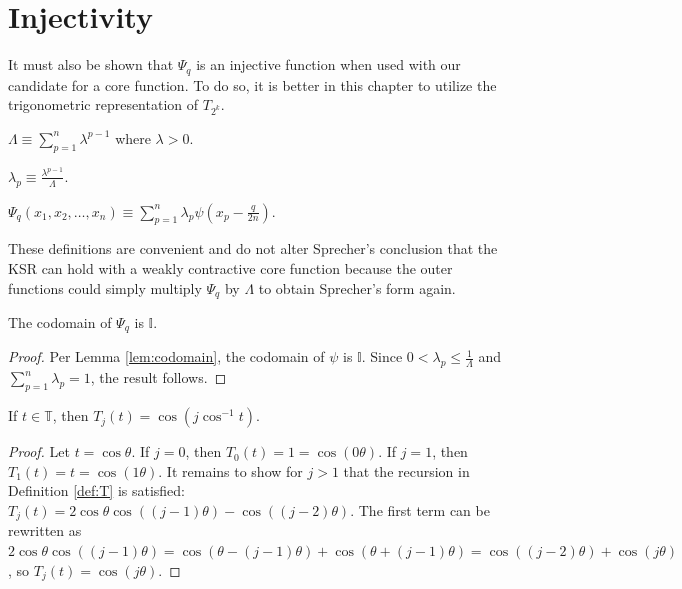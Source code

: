 \chapter{Injectivity}\label{ch:Injectivity}
It must also be shown that $\Psi_q$ is an injective function when used with our candidate for a core function. To do so, it is better in this chapter to utilize the trigonometric representation of $T_{2^k}$.
\begin{definition}[Normalizer]
  \label{def:Lambda}
  $\Lambda \equiv \sum\limits_{p = 1}^n \lambda^{p - 1}$ where $\lambda > 0$.
\end{definition}
\begin{definition}
  \label{def:lambda_p}
  $\lambda_p \equiv \frac{\lambda^{p - 1}}{\Lambda}$.
\end{definition}
\begin{definition}
  \label{def:Psi}
  $\Psi_q\left(x_1, x_2, \dots, x_n\right) \equiv \sum\limits_{p = 1}^n \lambda_p \psi\left(x_p - \frac{q}{2n}\right)$.
\end{definition}
\noindent These definitions are convenient and do not alter Sprecher's conclusion that the KSR can hold with a weakly contractive core function because the outer functions could simply multiply $\Psi_q$ by $\Lambda$ to obtain Sprecher's form again.
\begin{lemma}
  \label{lem:Psi_q_codomain}
  The codomain of $\Psi_q$ is $\mathbb{I}$.
\end{lemma}
\begin{proof}
  Per Lemma \ref{lem:codomain}, the codomain of $\psi$ is $\mathbb{I}$. Since $0 < \lambda_p \leq \frac{1}{\Lambda}$ and $\sum\limits_{p = 1}^n \lambda_p = 1$, the result follows.
\end{proof}

\begin{lemma}[]
  \label{lem:trigonometric}
  \leanok
  If $t \in \mathbb{T}$, then $T_j\left(t\right) = \cos\left(j \cos^{-1}t\right)$.
\end{lemma}
  
\begin{proof}
  \leanok
  Let $t = \cos \theta$. If $j = 0$, then $T_0\left(t\right) = 1 = \cos\left(0 \theta\right)$. If $j = 1$, then $T_1\left(t\right) = t = \cos\left(1 \theta\right)$. It remains to show for $j > 1$ that the recursion in Definition \ref{def:T} is satisfied: $T_j\left(t\right) = 2 \cos \theta \cos\left(\left(j - 1\right) \theta\right) - \cos\left(\left(j - 2\right) \theta\right)$. The first term can be rewritten as $2\cos \theta \cos\left(\left(j - 1\right) \theta\right) = \cos\left(\theta - \left(j - 1\right)\theta\right) + \cos\left(\theta + \left(j - 1\right)\theta\right) = \cos\left(\left(j - 2\right)\theta\right) + \cos\left(j \theta\right)$, so $T_j\left(t\right) = \cos\left(j \theta\right)$.
\end{proof}

